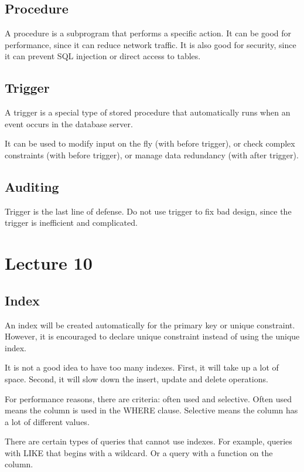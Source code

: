 \documentclass[a4paper,12pt]{article}
\begin{document}
\subsection{Procedure}

A procedure is a subprogram that performs a specific action.
It can be good for performance, since it can reduce network traffic.
It is also good for security, since it can prevent SQL injection or direct access to tables.

\subsection{Trigger}

A trigger is a special type of stored procedure that automatically runs when an event occurs in the database server.

It can be used to modify input on the fly (with before trigger),
or check complex constraints (with before trigger),
or manage data redundancy (with after trigger).

\subsection{Auditing}

Trigger is the last line of defense.
Do not use trigger to fix bad design, since the trigger is inefficient and complicated.

\section{Lecture 10}

\subsection{Index}

An index will be created automatically for the primary key or unique constraint.
However, it is encouraged to declare unique constraint instead of using the unique index.

It is not a good idea to have too many indexes.
First, it will take up a lot of space.
Second, it will slow down the insert, update and delete operations.

For performance reasons, there are criteria: often used and selective.
Often used means the column is used in the WHERE clause.
Selective means the column has a lot of different values.

There are certain types of queries that cannot use indexes.
For example, queries with LIKE that begins with a wildcard.
Or a query with a function on the column.
\end{document}
